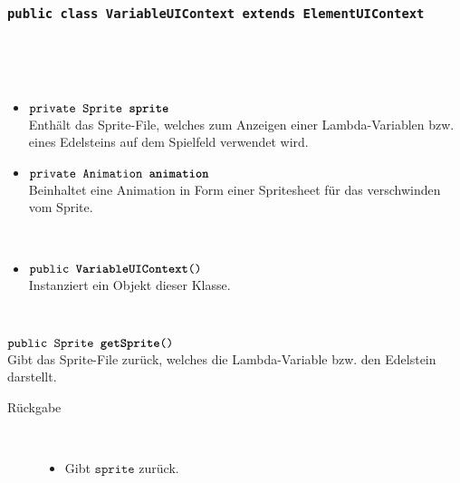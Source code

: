		\subsubsection{\normalfont \texttt{public class \textbf{VariableUIContext} extends ElementUIContext}}

\begin{description}
\item[Beschreibung] \hfill \\ 
\item[Attribute] \hfill \\
	\vspace{-.8cm}
	\begin{itemize}	
		\item $\texttt{private Sprite \textbf{sprite}}$ \\ Enthält das Sprite-File, welches zum Anzeigen einer Lambda-Variablen bzw. eines Edelsteins auf dem Spielfeld verwendet wird.
		\item $\texttt{private Animation \textbf{animation}}$ \\ Beinhaltet eine Animation in Form einer Spritesheet für das verschwinden vom Sprite.
		\end{itemize}
	
\item[Konstruktoren] \hfill \\
	\vspace{-.8cm}
	\begin{itemize}
		\item $\texttt{public \textbf{VariableUIContext}()}$ \\ Instanziert ein Objekt dieser Klasse.

	\end{itemize}
	
\item[Methoden] \hfill \\
	\vspace{-.8cm}
		\item $\texttt{public Sprite \textbf{getSprite}()}$ \\ Gibt das Sprite-File zurück, welches die Lambda-Variable bzw. den Edelstein darstellt.
		\begin{description}
			\item[Rückgabe] \hfill \\
			\vspace{-.8cm}
			\begin{itemize}
				\item Gibt $\texttt{sprite}$ zurück.
			\end{itemize}
			\end{description}
			

\end{description}
